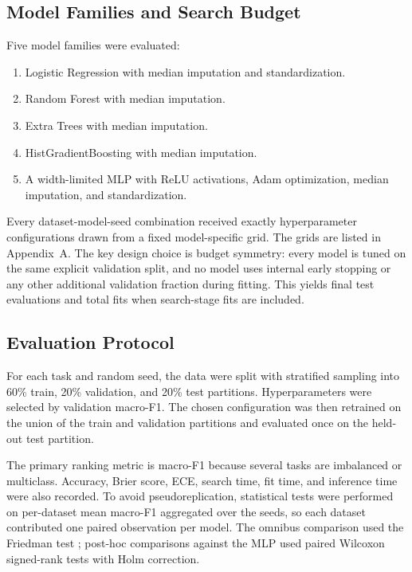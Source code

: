 \documentclass{ieeeaccess}
\begin{document}
\begin{table}[!t]
\caption{Benchmark tasks selected deterministically from \BenchmarkSuiteName{}. Task ID and Data ID refer to OpenML identifiers. Minority share is the fraction of examples in the least frequent class.}
\label{tab:datasets}
\centering
\scriptsize
\resizebox{\columnwidth}{!}{}
\end{table}

\subsection{Model Families and Search Budget}
Five model families were evaluated:
\begin{enumerate}
\item Logistic Regression with median imputation and standardization.
\item Random Forest with median imputation.
\item Extra Trees with median imputation.
\item HistGradientBoosting with median imputation.
\item A width-limited MLP with ReLU activations, Adam optimization, median imputation, and standardization.
\end{enumerate}

Every dataset-model-seed combination received exactly \SearchConfigsPerModel{} hyperparameter configurations drawn from a fixed model-specific grid. The grids are listed in Appendix~A. The key design choice is budget symmetry: every model is tuned on the same explicit validation split, and no model uses internal early stopping or any other additional validation fraction during fitting. This yields \TotalRuns{} final test evaluations and \TotalModelFits{} total fits when search-stage fits are included.

\subsection{Evaluation Protocol}
For each task and random seed, the data were split with stratified sampling into 60\% train, 20\% validation, and 20\% test partitions. Hyperparameters were selected by validation macro-F1. The chosen configuration was then retrained on the union of the train and validation partitions and evaluated once on the held-out test partition.

The primary ranking metric is macro-F1 because several tasks are imbalanced or multiclass. Accuracy, Brier score, ECE, search time, fit time, and inference time were also recorded. To avoid pseudoreplication, statistical tests were performed on per-dataset mean macro-F1 aggregated over the \SeedCount{} seeds, so each dataset contributed one paired observation per model. The omnibus comparison used the Friedman test \cite{demsar2006}; post-hoc comparisons against the MLP used paired Wilcoxon signed-rank tests with Holm correction.
\end{document}

